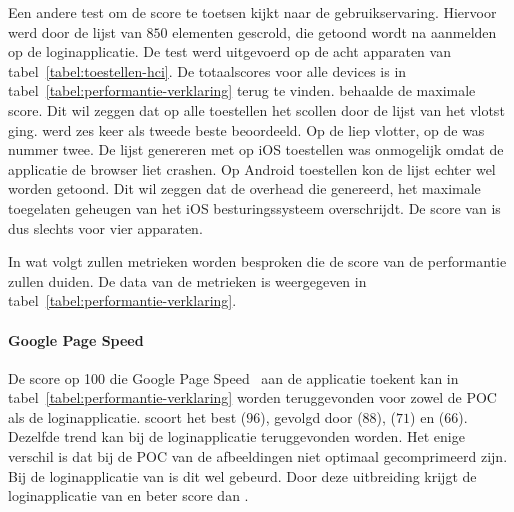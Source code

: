 Een andere test om de score te toetsen kijkt naar de gebruikservaring.
Hiervoor werd door de lijst van $850$ elementen gescrold, die getoond wordt na aanmelden op de loginapplicatie.
De test werd uitgevoerd op de acht apparaten van tabel~\ref{tabel:toestellen-hci}.
De totaalscores voor alle devices is in tabel~\ref{tabel:performantie-verklaring} terug te vinden.
\st{} behaalde de maximale score.
Dit wil zeggen dat op alle toestellen het scollen door de lijst van \st{} het vlotst ging.
\jqm{} werd zes keer als tweede beste beoordeeld. 
Op de \htc{} liep \kendo{} vlotter,  op de \ipadi{} was \lungo{} nummer twee.
De lijst genereren met \kendo{} op iOS toestellen was onmogelijk omdat de applicatie de browser liet crashen.
Op Android toestellen kon de \kendo{} lijst echter wel worden getoond.
Dit wil zeggen dat de overhead die \kendo{} genereerd, het maximale toegelaten geheugen van het iOS besturingssysteem overschrijdt.
De score van \kendo{} is dus slechts voor vier apparaten.



In wat volgt zullen metrieken worden besproken die de score van de performantie zullen duiden.
De data van de metrieken is weergegeven in tabel~\ref{tabel:performantie-verklaring}.

\paragraph{Google Page Speed}
De score op 100 die Google Page Speed~\cite{Morgan2011} aan de applicatie toekent kan in tabel~\ref{tabel:performantie-verklaring} worden teruggevonden voor zowel de POC als de loginapplicatie.
\st{} scoort het best ($96$),  gevolgd door \lungo{} ($88$),  \jqm{}($71$) en \kendo{}($66$).
Dezelfde trend kan bij de loginapplicatie teruggevonden worden.
Het enige verschil is dat bij de POC van \kendo{} de afbeeldingen niet optimaal gecomprimeerd zijn.
Bij de loginapplicatie van \kendo{} is dit wel gebeurd.
Door deze uitbreiding krijgt de loginapplicatie van \kendo{} en beter score dan \jqm{}.

